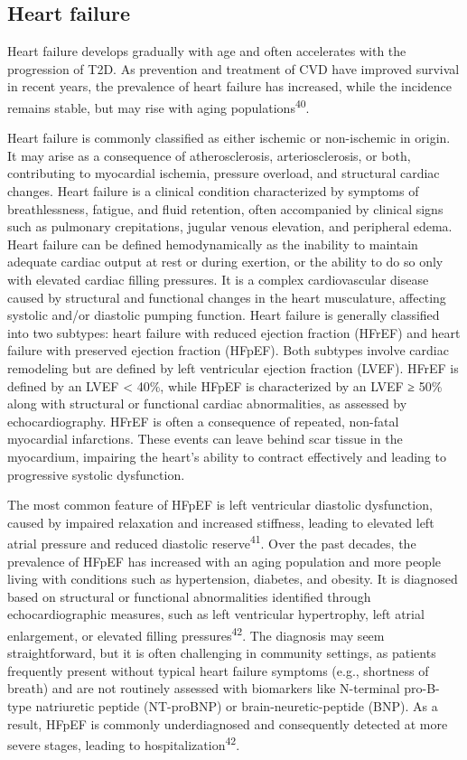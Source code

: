 \documentclass[
  a4paper,
  headsepline=true,
  open=any]{scrbook}
\begin{document}
\hypertarget{heart-failure}{%
\subsection{Heart failure}\label{heart-failure}}

Heart failure develops gradually with age and often accelerates with the
progression of T2D. As prevention and treatment of CVD have improved
survival in recent years, the prevalence of heart failure has increased,
while the incidence remains stable, but may rise with aging
populations\textsuperscript{40}.

Heart failure is commonly classified as either ischemic or non-ischemic
in origin. It may arise as a consequence of atherosclerosis,
arteriosclerosis, or both, contributing to myocardial ischemia, pressure
overload, and structural cardiac changes. Heart failure is a clinical
condition characterized by symptoms of breathlessness, fatigue, and
fluid retention, often accompanied by clinical signs such as pulmonary
crepitations, jugular venous elevation, and peripheral edema. Heart
failure can be defined hemodynamically as the inability to maintain
adequate cardiac output at rest or during exertion, or the ability to do
so only with elevated cardiac filling pressures. It is a complex
cardiovascular disease caused by structural and functional changes in
the heart musculature, affecting systolic and/or diastolic pumping
function. Heart failure is generally classified into two subtypes: heart
failure with reduced ejection fraction (HFrEF) and heart failure with
preserved ejection fraction (HFpEF). Both subtypes involve cardiac
remodeling but are defined by left ventricular ejection fraction (LVEF).
HFrEF is defined by an LVEF \textless{} 40\%, while HFpEF is
characterized by an LVEF ≥ 50\% along with structural or functional
cardiac abnormalities, as assessed by echocardiography. HFrEF is often a
consequence of repeated, non-fatal myocardial infarctions. These events
can leave behind scar tissue in the myocardium, impairing the heart's
ability to contract effectively and leading to progressive systolic
dysfunction.

The most common feature of HFpEF is left ventricular diastolic
dysfunction, caused by impaired relaxation and increased stiffness,
leading to elevated left atrial pressure and reduced diastolic
reserve\textsuperscript{41}. Over the past decades, the prevalence of
HFpEF has increased with an aging population and more people living with
conditions such as hypertension, diabetes, and obesity. It is diagnosed
based on structural or functional abnormalities identified through
echocardiographic measures, such as left ventricular hypertrophy, left
atrial enlargement, or elevated filling pressures\textsuperscript{42}.
The diagnosis may seem straightforward, but it is often challenging in
community settings, as patients frequently present without typical heart
failure symptoms (e.g., shortness of breath) and are not routinely
assessed with biomarkers like N-terminal pro-B-type natriuretic peptide
(NT-proBNP) or brain-neuretic-peptide (BNP). As a result, HFpEF is
commonly underdiagnosed and consequently detected at more severe stages,
leading to hospitalization\textsuperscript{42}.
\end{document}
